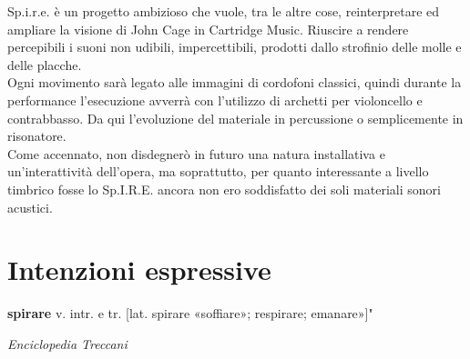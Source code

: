 Sp.i.r.e. è un progetto ambizioso che vuole, tra le altre cose, reinterpretare ed ampliare la visione di John Cage in Cartridge Music. Riuscire a rendere percepibili i suoni non udibili,  impercettibili, prodotti dallo strofinio delle molle e delle placche. \\
Ogni movimento sarà legato alle immagini di cordofoni classici, quindi durante la performance l'esecuzione avverrà con l'utilizzo di archetti per violoncello e contrabbasso. Da qui l'evoluzione del materiale in percussione o semplicemente in risonatore. \\ 
Come accennato, non disdegnerò in futuro una natura installativa e un'interattività dell'opera, ma soprattutto, per quanto interessante a livello timbrico fosse lo Sp.I.R.E. ancora non ero soddisfatto dei soli materiali sonori acustici. \\

\section{Intenzioni espressive}
\epigraph{\textbf{spirare} v. intr. e tr. [lat. spirare «soffiare»; respirare; emanare»]"}
{\textit{Enciclopedia Treccani}}


